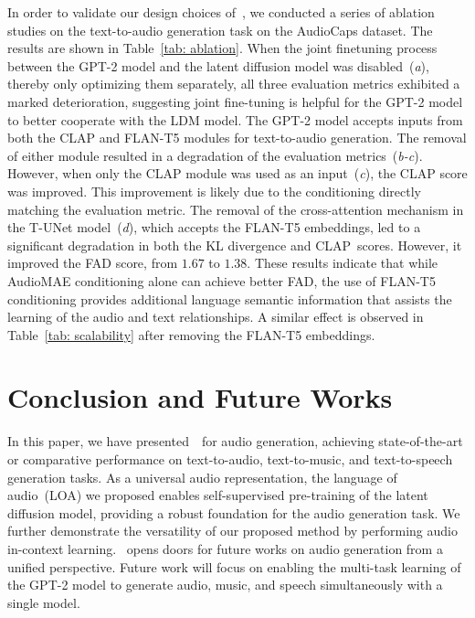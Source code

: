 \documentclass[lettersize,journal]{IEEEtran}
\begin{document}
\noindent
In order to validate our design choices of~\vModelName, we conducted a series of ablation studies on the text-to-audio generation task on the AudioCaps dataset. The results are shown in Table~\ref{tab: ablation}. When the joint finetuning process between the GPT-2 model and the latent diffusion model was disabled~(\textit{a}), thereby only optimizing them separately, all three evaluation metrics exhibited a marked deterioration, suggesting joint fine-tuning is helpful for the GPT-2 model to better cooperate with the LDM model. The GPT-2 model accepts inputs from both the CLAP and FLAN-T5 modules for text-to-audio generation. The removal of either module resulted in a degradation of the evaluation metrics~(\textit{b-c}). However, when only the CLAP module was used as an input~(\textit{c}), the CLAP score was improved. This improvement is likely due to the conditioning directly matching the evaluation metric. The removal of the cross-attention mechanism in the T-UNet model~(\textit{d}), which accepts the FLAN-T5 embeddings, led to a significant degradation in both the KL divergence and CLAP~scores. However, it improved the FAD score, from $1.67$ to $1.38$. These results indicate that while AudioMAE conditioning alone can achieve better FAD, the use of FLAN-T5 conditioning provides additional language semantic information that assists the learning of the audio and text relationships. A similar effect is observed in Table~\ref{tab: scalability} after removing the FLAN-T5 embeddings.







\section{Conclusion and Future Works}
\noindent
In this paper, we have presented~\vModelName~for audio generation, achieving state-of-the-art or comparative performance on text-to-audio, text-to-music, and text-to-speech generation tasks. 
As a universal audio representation, the language of audio~(LOA) we proposed enables self-supervised pre-training of the latent diffusion model, providing a robust foundation for the audio generation task.
We further demonstrate the versatility of our proposed method by performing audio in-context learning. \vModelName~opens doors for future works on audio generation from a unified perspective. Future work will focus on enabling the multi-task learning of the GPT-2 model to generate audio, music, and speech simultaneously with a single model. 
\end{document}
